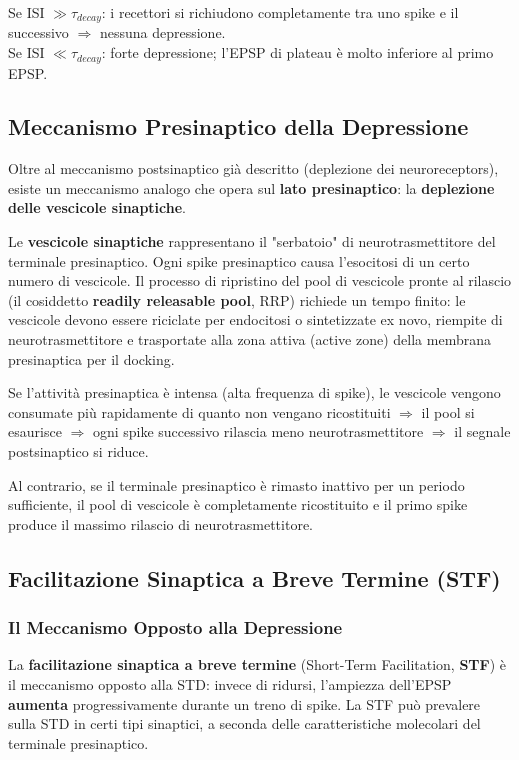 Se ISI $\gg \tau_{decay}$: i recettori si richiudono completamente tra uno spike e il successivo $\Rightarrow$ nessuna depressione.\\
Se ISI $\ll \tau_{decay}$: forte depressione; l'EPSP di plateau è molto inferiore al primo EPSP.



\subsection{Meccanismo Presinaptico della Depressione}

Oltre al meccanismo postsinaptico già descritto (deplezione dei neuroreceptors), esiste un meccanismo analogo che opera sul \textbf{lato presinaptico}: la \textbf{deplezione delle vescicole sinaptiche}.

Le \textbf{vescicole sinaptiche} rappresentano il "serbatoio" di neurotrasmettitore del terminale presinaptico. Ogni spike presinaptico causa l'esocitosi di un certo numero di vescicole. Il processo di ripristino del pool di vescicole pronte al rilascio (il cosiddetto \textbf{readily releasable pool}, RRP) richiede un tempo finito: le vescicole devono essere riciclate per endocitosi o sintetizzate ex novo, riempite di neurotrasmettitore e trasportate alla zona attiva (active zone) della membrana presinaptica per il docking.

Se l'attività presinaptica è intensa (alta frequenza di spike), le vescicole vengono consumate più rapidamente di quanto non vengano ricostituiti $\Rightarrow$ il pool si esaurisce $\Rightarrow$ ogni spike successivo rilascia meno neurotrasmettitore $\Rightarrow$ il segnale postsinaptico si riduce.

Al contrario, se il terminale presinaptico è rimasto inattivo per un periodo sufficiente, il pool di vescicole è completamente ricostituito e il primo spike produce il massimo rilascio di neurotrasmettitore.


\subsection{Facilitazione Sinaptica a Breve Termine (STF)}

\subsubsection{Il Meccanismo Opposto alla Depressione}

La \textbf{facilitazione sinaptica a breve termine} (Short-Term Facilitation, \textbf{STF}) è il meccanismo opposto alla STD: invece di ridursi, l'ampiezza dell'EPSP \textbf{aumenta} progressivamente durante un treno di spike. La STF può prevalere sulla STD in certi tipi sinaptici, a seconda delle caratteristiche molecolari del terminale presinaptico.


